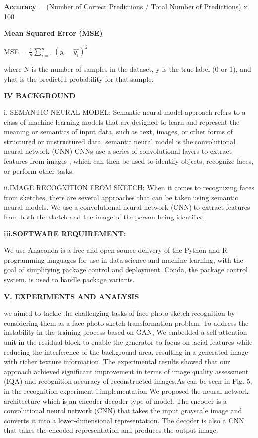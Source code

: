 \documentclass[journal]{IEEEtran} %
\begin{document}
\textbf{Accuracy} = (Number of Correct Predictions / Total Number of Predictions) x 100%
 
\textbf{Mean Squared Error (MSE) } 

MSE = $\frac{1}{n} \sum_{i=1}^{n} (y_i - \hat{y_i})^2$

where N is the number of samples in the dataset, y is the true label (0 or 1), and yhat is the predicted probability for that sample.

\textbf{IV BACKGROUND}

i. SEMANTIC NEURAL MODEL:
Semantic neural model approach refers to a class of machine learning models that are designed to learn and represent the meaning or semantics of input data, such as text, images, or other forms of structured or unstructured data. 
semantic neural model is the convolutional neural network (CNN)  
CNNs use a series of convolutional layers to extract features from images , which can then be used to identify objects, recognize faces, or perform other tasks.

ii.IMAGE RECOGNITION FROM SKETCH:
When it comes to recognizing faces from sketches, there are several approaches that can be taken using semantic neural models. 
We use a convolutional neural network (CNN) to extract features from both the sketch and the image of the person being identified.

\textbf{iii.SOFTWARE REQUIREMENT:}

We use Anaconda is a free and open-source delivery of the Python and R programming languages for use in data science and machine learning, with the goal of simplifying package control and deployment. Conda, the package control system, is used to handle package variants.

\vspace

\textbf{\textbf{V. EXPERIMENTS AND ANALYSIS}}

we aimed to tackle the challenging tasks of face photo-sketch recognition by considering them as a face photo-sketch transformation problem. To address the instability in the training process based on GAN, We embedded a self-attention unit in the residual block to enable the generator to focus on facial features while reducing the interference of the background area, resulting in a generated image with richer texture information.
 The experimental results showed that our approach achieved significant improvement in terms of image quality assessment (IQA) and recognition accuracy of reconstructed images.As can be seen in Fig. 5, in the recognition experiment
i.implementation
We proposed the neural network architecture which is an encoder-decoder type of model. The encoder is a convolutional neural network (CNN) that takes the input grayscale image and converts it into a lower-dimensional representation. The decoder is also a CNN that takes the encoded representation and produces the output image.
\end{document}
